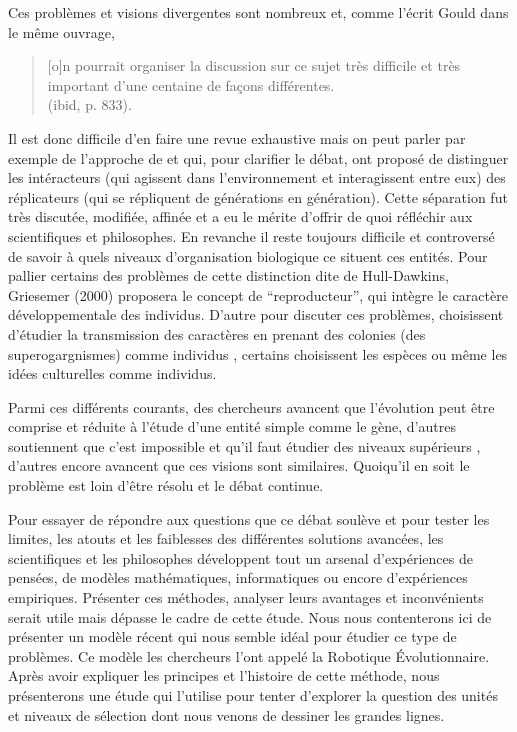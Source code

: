 \documentclass[a4paper,10pt]{article}
\begin{document}
Ces problèmes et visions divergentes sont nombreux et, comme l'écrit Gould dans le même ouvrage,
\begin{quote}
	[o]n pourrait organiser la discussion sur ce sujet très difficile et très important d'une centaine de façons différentes.\\
	(ibid, p. 833).
\end{quote}
Il est donc difficile d'en faire une revue exhaustive mais on peut parler par exemple de l'approche de \cite{dawkins76selfishgene} et \cite{hull1974philosophyofbiologicalscience} qui, pour clarifier le débat, ont proposé de distinguer les intéracteurs (qui agissent dans l'environnement et interagissent entre eux) des réplicateurs (qui se répliquent de générations en génération). Cette séparation fut très discutée, modifiée, affinée et a eu le mérite d'offrir de quoi réfléchir aux scientifiques et philosophes. En revanche il reste toujours difficile et controversé de savoir à quels niveaux d'organisation biologique ce situent ces entités. Pour pallier certains des problèmes de cette distinction dite de Hull-Dawkins, Griesemer (2000) proposera le concept de ``reproducteur'', qui intègre le caractère développementale des individus. D'autre pour discuter ces problèmes, choisissent d'étudier la transmission des caractères en prenant des colonies (des superogargnismes) comme individus \citep{wilson1989revivingsuperorganism}, certains choisissent les espèces ou même les idées culturelles \citep[p. 147]{godfrey2009darwinian} comme individus.


Parmi ces différents courants, des chercheurs avancent que l'évolution peut être comprise et réduite à l'étude d'une entité simple comme le gène\cite{dawkins76selfishgene,dennett95darwinsdangerousideaevolutionmeaningslife}, d'autres soutiennent que c'est impossible et qu'il faut étudier des niveaux supérieurs \citep{gould2002thestructureofevolutionarytheory,wilson1989revivingsuperorganism}, d'autres encore avancent que ces visions sont similaires. Quoiqu'il en soit le problème est loin d'être résolu et le débat continue. 

Pour essayer de répondre aux questions que ce débat soulève et pour tester les limites, les atouts et les faiblesses des différentes solutions avancées, les scientifiques et les philosophes développent tout un arsenal d'expériences de pensées, de modèles mathématiques, informatiques ou encore d'expériences empiriques. Présenter ces méthodes, analyser leurs avantages et inconvénients serait utile mais dépasse le cadre de cette étude. 
Nous nous contenterons ici de présenter un modèle récent qui nous semble idéal pour étudier ce type de problèmes. Ce modèle les chercheurs l'ont appelé la Robotique \'Evolutionnaire. Après avoir expliquer les principes et l'histoire de cette méthode, nous présenterons une étude qui l'utilise pour tenter d'explorer la question des unités et niveaux de sélection dont nous venons de dessiner les grandes lignes.
\end{document}
